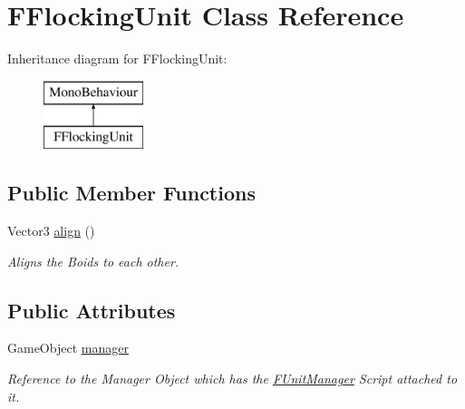 \hypertarget{class_f_flocking_unit}{}\section{F\+Flocking\+Unit Class Reference}
\label{class_f_flocking_unit}
Inheritance diagram for F\+Flocking\+Unit\+:\begin{figure}[H]
\begin{center}
\leavevmode
\includegraphics[height=2.000000cm]{class_f_flocking_unit}
\end{center}
\end{figure}
\subsection*{Public Member Functions}
\begin{DoxyCompactItemize}
\item 
\mbox{\label{class_f_flocking_unit_a37ff018f3fcd1581b114549cf550361e}} 
Vector3 \hyperlink{class_f_flocking_unit_a37ff018f3fcd1581b114549cf550361e}{align} ()
\begin{DoxyCompactList}\small\item\em Aligns the Boids to each other. \end{DoxyCompactList}\end{DoxyCompactItemize}
\subsection*{Public Attributes}
\begin{DoxyCompactItemize}
\item 
Game\+Object \hyperlink{class_f_flocking_unit_af63c7d39a0269bb66be7f75c7ee830be}{manager}
\begin{DoxyCompactList}\small\item\em Reference to the Manager Object which has the \hyperlink{class_f_unit_manager}{F\+Unit\+Manager} Script attached to it. \end{DoxyCompactList}\end{DoxyCompactItemize}
